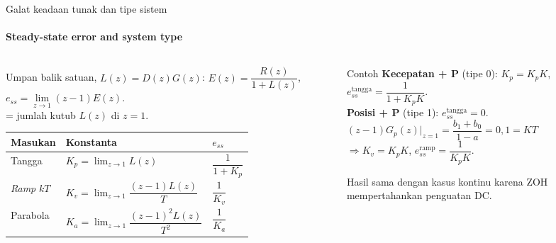 \documentclass[aspectratio=169,10pt]{beamer}
\begin{document}
\begin{frame}{Galat keadaan tunak dan tipe sistem}
	\framesubtitle{Steady-state error and system type}
	\begin{columns}[T]
		\begin{column}{0.52\textwidth}
			\small
			Umpan balik satuan, $L(z) = D(z)G(z)$: $E(z) = \dfrac{R(z)}{1+L(z)}$,\ \ $e_{ss} = \lim\limits_{z\to1}(z-1)E(z)$.\\[2pt]
			 = jumlah kutub $L(z)$ di $z=1$.\\[3pt]
			\footnotesize
			\renewcommand{\arraystretch}{1.9}
			\begin{tabular}{@{}l l l@{}}
				\toprule
				Masukan & Konstanta & $e_{ss}$ \\
				\midrule
				Tangga & $K_p = \lim_{z\to1}L(z)$ & $\dfrac{1}{1+K_p}$ \\
				\textit{Ramp} $kT$ & $K_v = \lim_{z\to1}\dfrac{(z-1)L(z)}{T}$ & $\dfrac{1}{K_v}$ \\
				Parabola & $K_a = \lim_{z\to1}\dfrac{(z-1)^2L(z)}{T^2}$ & $\dfrac{1}{K_a}$ \\
				\bottomrule
			\end{tabular}
		\end{column}
		\begin{column}{0.44\textwidth}
			\begin{exampleblock}{Contoh}
				\small
				\textbf{Kecepatan + P} (tipe 0): $K_p = K_pK$, $e_{ss}^{\text{tangga}} = \dfrac{1}{1+K_pK}$.\\[4pt]
				\textbf{Posisi + P} (tipe 1): $e_{ss}^{\text{tangga}} = 0$.\\
				$(z-1)G_p(z)\big|_{z=1} = \dfrac{b_1+b_0}{1-a} = 0{,}1 = KT$\\
				$\Rightarrow K_v = K_pK$, $e_{ss}^{\text{ramp}} = \dfrac{1}{K_pK}$.
			\end{exampleblock}
			{\small Hasil sama dengan kasus kontinu karena ZOH mempertahankan penguatan DC.}
		\end{column}
	\end{columns}
\end{frame}
\end{document}
